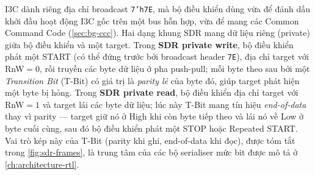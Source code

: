 I3C dành riêng địa chỉ broadcast \texttt{7'h7E}, mà bộ điều khiển dùng vừa để đánh dấu khởi
đầu hoạt động I3C gốc trên một bus hỗn hợp, vừa để mang các Common Command Code
(\cref{sec:bg-ccc}). Hai dạng khung SDR mang dữ liệu riêng (private) giữa bộ điều khiển và một
target. Trong \textbf{SDR private write}, bộ điều khiển phát một START (có thể đứng trước bởi
broadcast header \texttt{7E}), địa chỉ target với RnW${=}0$, rồi truyền các byte dữ liệu ở pha
push-pull; mỗi byte theo sau bởi một \emph{Transition Bit} (T-Bit) có giá trị là \emph{parity
lẻ} của byte đó, giúp target phát hiện một byte bị hỏng. Trong \textbf{SDR private read}, bộ
điều khiển địa chỉ target với RnW${=}1$ và target lái các byte dữ liệu; lúc này T-Bit mang tín
hiệu \emph{end-of-data} thay vì parity --- target giữ nó ở High khi còn byte tiếp theo và lái
nó về Low ở byte cuối cùng, sau đó bộ điều khiển phát một STOP hoặc Repeated START. Vai trò kép
này của T-Bit (parity khi ghi, end-of-data khi đọc), được tóm tắt trong \cref{fig:sdr-frames},
là trung tâm của các bộ serialiser mức bit được mô tả ở \cref{ch:architecture-rtl}.

